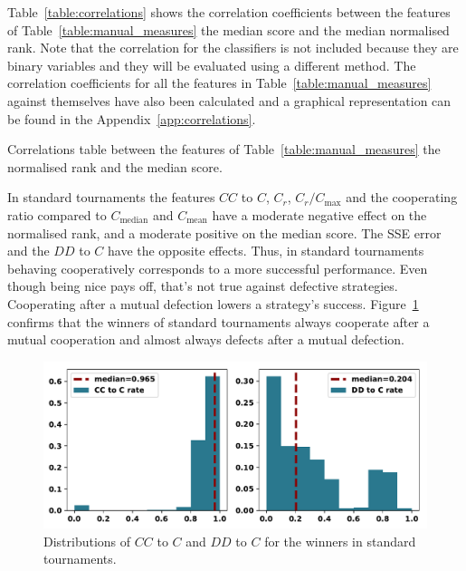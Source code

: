 \documentclass{article}
\begin{document}
Table~\ref{table:correlations} shows the correlation coefficients between the
features of Table~\ref{table:manual_measures} the median score and the median
normalised rank. Note that the correlation for the classifiers is
not included because they are binary variables and they will be evaluated using a
different method. The correlation coefficients for all the features in
Table~\ref{table:manual_measures} against themselves have also been calculated and a
graphical representation can be found in the Appendix~\ref{app:correlations}.

\begin{table}[!htbp]
    \begin{center}
    \resizebox{.9\textwidth}{!}{
        
    }
\end{center}
\caption{Correlations table between the features of Table~\ref{table:manual_measures}
the normalised rank and the median score.}\label{table:correlations}
\end{table}

In standard tournaments the features  $CC$ to $C$, $C_r$, $C_r / C_{\text{max}}$
and the cooperating ratio compared to $C_{\text{median}}$ and $C_{\text{mean}}$
have a moderate negative effect on the normalised rank, and a moderate positive
on the median score. The SSE error and the $DD$ to $C$ have the opposite
effects. Thus, in standard tournaments behaving cooperatively corresponds to a
more successful performance. Even though being nice pays off,
that's not true against defective strategies. Cooperating after a mutual
defection lowers a strategy's success.
Figure~\ref{fig:rates_of_winners_in_standard_tournaments} confirms that the
winners of standard tournaments always cooperate after a mutual cooperation and
almost always defects after a mutual defection.

\begin{figure}[!htbp]
    \centering
    \includegraphics[width=.65\textwidth]{../images/rates_of_winners_in_standard_tournaments.pdf}
    \caption{Distributions of $CC$ to $C$ and $DD$ to $C$ for the winners in
    standard tournaments.}\label{fig:rates_of_winners_in_standard_tournaments}
\end{figure}
\end{document}

